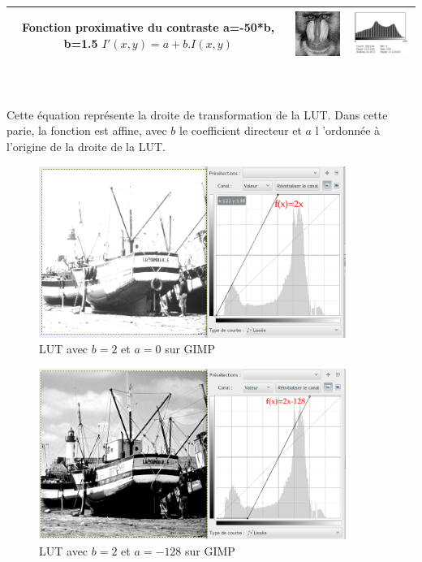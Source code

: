 \documentclass[a4paper,11pt]{article}
\begin{document}
\begin{tabular}{|c|c|c|}
    \hline
  \end{tabular}
  
  \begin{tabular}{|c|c|c|}
    \hline
    \shortstack{Fonction proximative du contraste \\ a=-50*b, b=1.5 \\ $I'(x,y)=a+b.I(x,y)$} & \includegraphics[width=3cm]{../res/mandrillQ2_contrast.png} & \includegraphics[width=4cm]{../histo/resultat/hist_mandrillQ2_contrast.png}\\
    \hline
  \end{tabular}\\
  
  \ \\
  
  Cette équation représente la droite de transformation de la LUT. Dans cette parie, 
  la fonction est affine, avec $b$ le coefficient directeur et $a$ l 'ordonnée à 
  l'origine de la droite de la LUT.
  
  \begin{figure}[H]
    \center
    \includegraphics[width=10cm]{../res/Q2_LUT1.png}
    \caption{LUT avec $b=2$ et $a=0$ sur GIMP}
  \end{figure}
  
  \begin{figure}[H]
    \center
    \includegraphics[width=10cm]{../res/Q2_LUT2.png}
    \caption{LUT avec $b=2$ et $a=-128$ sur GIMP}
  \end{figure}
\end{document}
